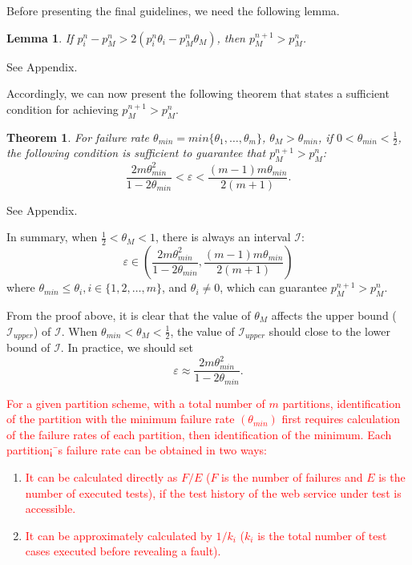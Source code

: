 \documentclass[10pt,journal,compsoc]{IEEEtran}
\begin{document}
Before presenting the final guidelines, we need the following lemma.
\newtheorem{lem}{Lemma}
\label{Lemma}
\begin{lem}
  If $p_i^{n} - p_M^{n} > 2(p_i^{n}\theta_i - p_M^{n}\theta_M)$, then $p_M^{n + 1} > p_M^{n}$.
\end{lem}
\begin{IEEEproof}
See Appendix.
\end{IEEEproof}

Accordingly, we can now present the following theorem that states a sufficient condition for achieving $p_M^{n + 1} > p_M^{n}$.
\newtheorem{theo}{Theorem}
\label{theorem}
\begin{theo}
  For failure rate $\theta_{min} = min\{\theta_1, \ldots, \theta_m\}$, $\theta_M > \theta_{min}$, if $0 < \theta_{min} < \frac{1}{2}$, the following condition is sufficient to guarantee that $p_M^{n + 1} > p_M^{n}$:
\begin{equation}
\label{equa:results}
  \displaystyle\frac{2m\theta_{min}^2}{1-2\theta_{min}} < \varepsilon < \displaystyle\frac{(m-1)m\theta_{min}}{2(m + 1)}.
\end{equation}
\end{theo}
\begin{IEEEproof}
See Appendix.
\end{IEEEproof}

In summary, when $\frac{1}{2} < \theta_M < 1$, there is always an interval $\mathcal{I}$:
\begin{equation}
  \varepsilon \in (\displaystyle\frac{2m\theta_{min}^2}{1 - 2\theta_{min}}, \displaystyle\frac{(m - 1)m\theta_{min}}{2(m + 1)})
\end{equation}
where $\theta_{min} \le \theta_i, i \in \{1, 2, \ldots, m\}$, and $\theta_i \ne 0$, which can guarantee $p_M^{n+1} > p_M^n$.

From the proof above, it is clear that the value of $\theta_M$ affects the upper bound ($\mathcal{I}_{upper}$) of $\mathcal{I}$.
When $\theta_{min} < \theta_M < \frac{1}{2}$, the value of $\mathcal{I}_{upper}$ should close to the lower bound of $\mathcal{I}$.
In practice, we should set
\begin{equation}
\label{euqtion:approxValue}
  \varepsilon \approx \frac{2m\theta_{min}^2}{1-2\theta_{min}}.
\end{equation}

\textcolor{red}{For a given partition scheme, with a total number of $m$ partitions, identification of the partition with the minimum failure rate $(\theta_{min})$ first requires calculation of the failure rates of each partition, then identification of the minimum. Each partition¡¯s failure rate can be obtained in two ways:}
\begin{enumerate}[1)]
  \item
  \textcolor{red}{It can be calculated directly as $F / E$ ($F$ is the number of failures and $E$ is the number of executed tests), if the test history of the web service under test is accessible.}

  \item
  \textcolor{red}{It can be approximately calculated by $1 / k_i$ ($k_i$ is the total number of test cases executed before revealing a fault).}
\end{enumerate}
\end{document}
